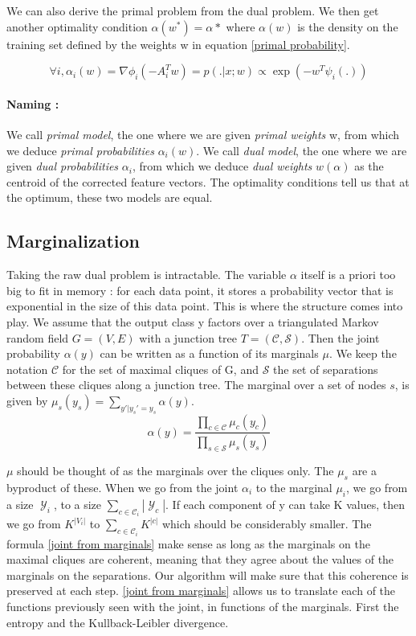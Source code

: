 \documentclass{article}
\DeclareMathOperator{\1}{\mathbb{1}}
\DeclareMathOperator{\Y}{\mathcal{Y}}
\begin{document}
We can also derive the primal problem from the dual problem.
We then get another optimality condition $\alpha(w^*) = \alpha*$ where $\alpha(w)$ is the density on the training set defined by the weights w in equation \ref{primal probability}.

\begin{equation}
	\forall i, \alpha_i(w) = \nabla\phi_i(-A_i^Tw) = p(.|x; w) \propto \exp(-w^T \psi_i(.))
\end{equation}

\paragraph{Naming :} 
We call \textit{primal model}, the one where we are given \textit{primal weights} w, from which we deduce \textit{primal probabilities} $\alpha_i(w)$.
We call \textit{dual model}, the one where we are given \textit{dual probabilities} $\alpha_i$, from which we deduce \textit{dual weights} $w(\alpha)$ as the centroid of the corrected feature vectors.
The optimality conditions tell us that at the optimum, these two models are equal.

\subsection{Marginalization}

Taking the raw dual problem is intractable.
The variable $\alpha$ itself is a priori too big to fit in memory : for each data point, it stores a probability vector that is exponential in the size of this data point.
This is where the structure comes into play.
We assume that the output class y factors over a triangulated Markov random field $G=(V,E)$ with a junction tree $T=(\mathcal{C},\mathcal{S})$.
Then the joint probability $\alpha(y)$ can be written as a function of its marginals $\mu$.
We keep the notation $\mathcal{C}$ for the set of maximal cliques of G, and $\mathcal{S}$ the set of separations between these cliques along a junction tree.
The marginal over a set of nodes $s$, is given by $\mu_s(y_s) = \sum_{y' | y_s'=y_s} \alpha(y)$. 
\begin{equation}
	\label{joint from marginals}
	\alpha(y) = \frac{\prod_{c\in\mathcal{C}} \mu_c(y_c)}{\prod_{s\in\mathcal{S}} \mu_s(y_s)}
\end{equation}

$\mu$ should be thought of as the marginals over the cliques only.
The $\mu_s$ are a byproduct of these.
When we go from the joint $\alpha_i$ to the marginal $\mu_i$, we go from a size $\Y_i$, to a size $\sum_{c \in \mathcal C_i} |\Y_c|$.
If each component of y can take K values, then we go from $K^{|V_i|}$ to $\sum_{c \in \mathcal C_i} K^{|c|}$ which should be considerably smaller.
The formula \ref{joint from marginals} make sense as long as the marginals on the maximal cliques are coherent, meaning that they agree about the values of the marginals on the separations.
Our algorithm will make sure that this coherence is preserved at each step.
\ref{joint from marginals} allows us to translate each of the functions previously seen with the joint, in functions of the marginals.
First the entropy and the Kullback-Leibler divergence.
\end{document}
